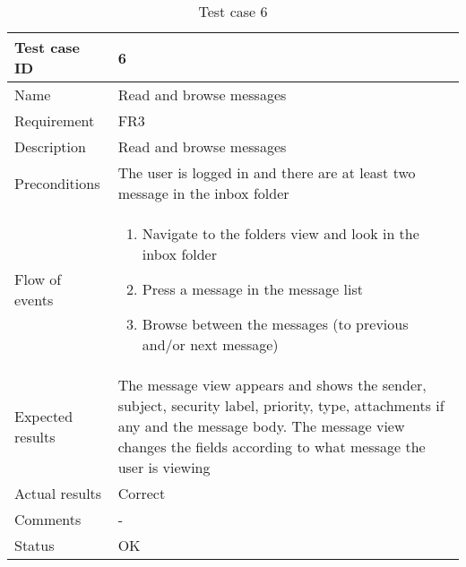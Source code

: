 		\begin{table}[htb]
			\begin{tabular}{l|p{10cm}}
				Test case ID & 6 \\ \hline
				Name & Read and browse messages\\ \hline
				Requirement & FR3\\ \hline
				Description & Read and browse messages\\ \hline
				Preconditions & The user is logged in and there are at least two message in the inbox folder\\ \hline
				Flow of events & 
					\begin{enumerate}
						\item{}Navigate to the folders view and look in the inbox folder
						\item{}Press a message in the message list
						\item{}Browse between the messages (to previous and/or next message)
					\end{enumerate} \\ \hline
				Expected results & The message view appears and shows the sender, subject, security label, priority, 							type, attachments if any and the message body. The message view changes the fields according to 						what message the user is viewing \\ \hline
				Actual results & Correct\\ \hline
				Comments & -\\ \hline
				Status & OK\\ \hline
			\end{tabular}
			\caption{Test case 6} \label{tab:case6}
		\end{table}


